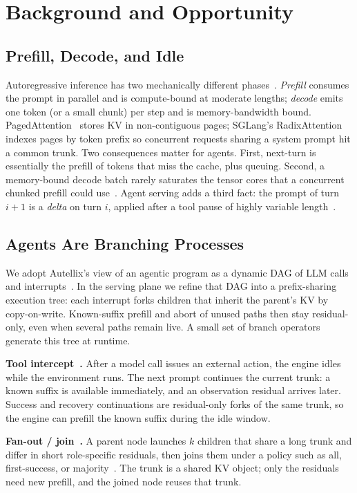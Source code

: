 \section{Background and Opportunity}
\label{sec:problem}

\subsection{Prefill, Decode, and Idle}
Autoregressive inference has two mechanically different phases~\cite{orca,distserve,splitwise}.
\emph{Prefill} consumes the prompt in parallel and is compute-bound at moderate lengths; \emph{decode} emits one token (or a small chunk) per step and is memory-bandwidth bound.
PagedAttention~\cite{vllm} stores KV in non-contiguous pages; SGLang's RadixAttention~\cite{sglang} indexes pages by token prefix so concurrent requests sharing a system prompt hit a common trunk.
Two consequences matter for agents.
First, next-turn \ttft{} is essentially the prefill of tokens that miss the cache, plus queuing.
Second, a memory-bound decode batch rarely saturates the tensor cores that a concurrent chunked prefill could use~\cite{sarathi}.
Agent serving adds a third fact: the prompt of turn $i{+}1$ is a \emph{delta} on turn $i$, applied after a tool pause of highly variable length~\cite{continuum,mori}.

\subsection{Agents Are Branching Processes}
We adopt Autellix's view of an agentic program as a dynamic DAG of LLM calls and interrupts~\cite{autellix}.
In the serving plane we refine that DAG into a prefix-sharing execution tree: each interrupt forks children that inherit the parent's KV by copy-on-write.
Known-suffix prefill and abort of unused paths then stay residual-only, even when several paths remain live.
A small set of branch operators generate this tree at runtime.

\smallskip\noindent\textbf{Tool intercept~\cite{react,toolformer,gorilla}.}
After a model call issues an external action, the engine idles while the environment runs.
The next prompt continues the current trunk: a known suffix is available immediately, and an observation residual arrives later.
Success and recovery continuations are residual-only forks of the same trunk, so the engine can prefill the known suffix during the idle window.

\smallskip\noindent\textbf{Fan-out / join~\cite{autogen,metagpt,pythia}.}
A parent node launches $k$ children that share a long trunk and differ in short role-specific residuals, then joins them under a policy such as all, first-success, or majority~\cite{selfconsistency}.
The trunk is a shared KV object; only the residuals need new prefill, and the joined node reuses that trunk.

